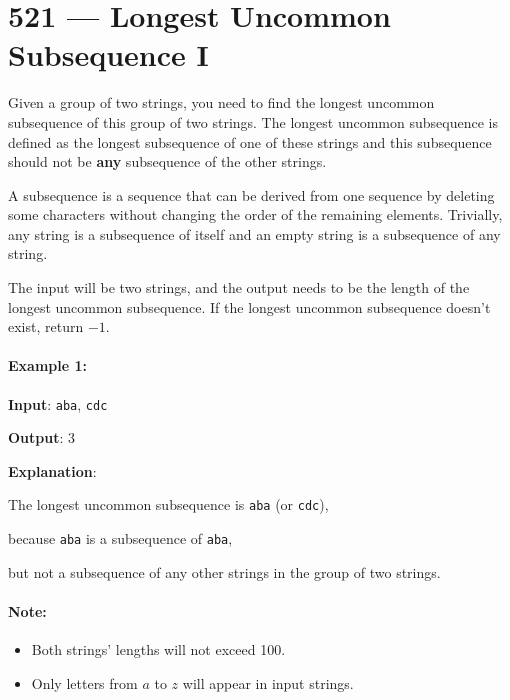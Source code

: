 \section{521 --- Longest Uncommon Subsequence I}
Given a group of two strings, you need to find the longest uncommon subsequence of this group of two strings. The longest uncommon subsequence is defined as the longest subsequence of one of these strings and this subsequence should not be \textbf{any} subsequence of the other strings.

A subsequence is a sequence that can be derived from one sequence by deleting some characters without changing the order of the remaining elements. Trivially, any string is a subsequence of itself and an empty string is a subsequence of any string.

The input will be two strings, and the output needs to be the length of the longest uncommon subsequence. If the longest uncommon subsequence doesn't exist, return $-1$.

\paragraph{Example 1:}

\begin{flushleft}
\textbf{Input}: \texttt{aba}, \texttt{cdc}

\textbf{Output}: 3

\textbf{Explanation}: 

The longest uncommon subsequence is \texttt{aba} (or \texttt{cdc}), 

because \texttt{aba} is a subsequence of \texttt{aba}, 

but not a subsequence of any other strings in the group of two strings. 
\end{flushleft}

\paragraph{Note:}

\begin{itemize}
\item Both strings' lengths will not exceed 100.
\item Only letters from $a$ to $z$ will appear in input strings.
\end{itemize}
